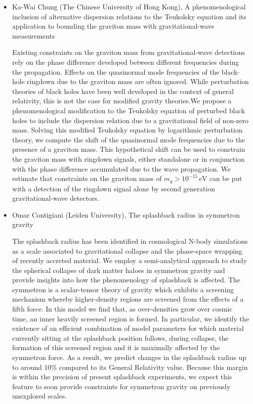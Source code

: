 \documentclass[letterpaper,12pt]{article}
\newcommand{\talk}[2]{{\fontspec{Lato Bold} #1,} {\fontspec{Lato Italic} #2}}
\begin{document}
\begin{itemize}
\item \talk{Ka-Wai Chung (The Chinese University of Hong Kong)}{A phenomenological inclusion of alternative dispersion relations to the Teukolsky equation and its application to bounding the graviton mass with gravitational-wave measurements}

Existing constraints on the graviton mass from gravitational-wave detections rely on the phase difference developed between different frequencies during the propagation. Effects on the quasinormal mode frequencies of the black-hole ringdown due to the graviton mass are often ignored. While perturbation theories of black holes have been well developed in the context of general relativity, this is not the case for modified gravity theories.We propose a phenomenological modification to the Teukolsky equation of perturbed black holes to include the dispersion relation due to a gravitational field of non-zero mass. Solving this modified Teukolsky equation by logarithmic perturbation theory, we compute the shift of the quasinormal mode frequencies due to the presence of a graviton mass. This hypothetical shift can be used to constrain the graviton mass with ringdown signals, either standalone or in conjunction with the phase difference accumulated due to the wave propagation. We estimate that constraints on the graviton mass of $m_g > 10^{-15}\,\textrm{eV}$ can be put with a detection of the ringdown signal alone by second generation gravitational-wave detectors.


\item \talk{Omar Contigiani (Leiden University)}{The splashback radius in symmetron gravity}

The splashback radius has been identified in cosmological N-body simulations as a scale associated to gravitational collapse and the phase-space wrapping of recently accreted material.  We employ a semi-analytical approach to study the spherical collapse of dark matter haloes in symmetron gravity and provide insights into how the phenomenology of splashback is affected.  The symmetron is a scalar-tensor theory of gravity which exhibits a screening mechanism whereby higher-density regions are  screened  from  the  effects  of  a  fifth  force.  In  this  model  we  find that,  as  over-densities  grow  over cosmic  time,  an  inner  heavily  screened  region  is  formed.   In  particular,  we  identify  the  existence of an efficient combination of model parameters for which material currently sitting at the splashback position follows, during collapse, the formation of this screened region and it is maximally affected by the symmetron force.  As  a  result,  we  predict  changes  in the splashback  radius up  to around 10\% compared  to its General  Relativity value.  Because this margin is within the precision of present splashback experiments, we expect this feature to soon provide constraints for symmetron gravity on previously unexplored scales.



\end{itemize}
\end{document}

